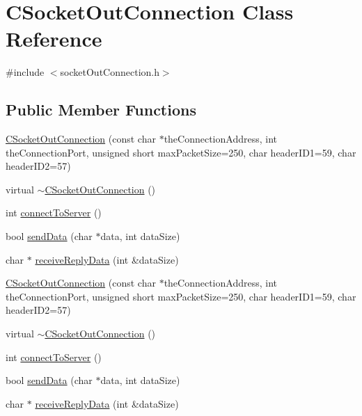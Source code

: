 \hypertarget{classCSocketOutConnection}{}\section{C\+Socket\+Out\+Connection Class Reference}
\label{classCSocketOutConnection}


{\ttfamily \#include $<$socket\+Out\+Connection.\+h$>$}

\subsection*{Public Member Functions}
\begin{DoxyCompactItemize}
\item 
\hyperlink{classCSocketOutConnection_a26ac9c4b8a575dfde5a896879fa84fb4}{C\+Socket\+Out\+Connection} (const char $\ast$the\+Connection\+Address, int the\+Connection\+Port, unsigned short max\+Packet\+Size=250, char header\+I\+D1=59, char header\+I\+D2=57)
\item 
virtual \hyperlink{classCSocketOutConnection_a1dec7524a61d96c85b008d6b3423a82a}{$\sim$\+C\+Socket\+Out\+Connection} ()
\item 
int \hyperlink{classCSocketOutConnection_a1be707b8bc47610dbf58443acf270297}{connect\+To\+Server} ()
\item 
bool \hyperlink{classCSocketOutConnection_a9266098d03f6f4f04941dcbc3a1f54f5}{send\+Data} (char $\ast$data, int data\+Size)
\item 
char $\ast$ \hyperlink{classCSocketOutConnection_a0255ab137779ad1ccc5687d579c2d14f}{receive\+Reply\+Data} (int \&data\+Size)
\item 
\hyperlink{classCSocketOutConnection_a26ac9c4b8a575dfde5a896879fa84fb4}{C\+Socket\+Out\+Connection} (const char $\ast$the\+Connection\+Address, int the\+Connection\+Port, unsigned short max\+Packet\+Size=250, char header\+I\+D1=59, char header\+I\+D2=57)
\item 
virtual \hyperlink{classCSocketOutConnection_a1dec7524a61d96c85b008d6b3423a82a}{$\sim$\+C\+Socket\+Out\+Connection} ()
\item 
int \hyperlink{classCSocketOutConnection_a1be707b8bc47610dbf58443acf270297}{connect\+To\+Server} ()
\item 
bool \hyperlink{classCSocketOutConnection_a9266098d03f6f4f04941dcbc3a1f54f5}{send\+Data} (char $\ast$data, int data\+Size)
\item 
char $\ast$ \hyperlink{classCSocketOutConnection_a0255ab137779ad1ccc5687d579c2d14f}{receive\+Reply\+Data} (int \&data\+Size)
\end{DoxyCompactItemize}
